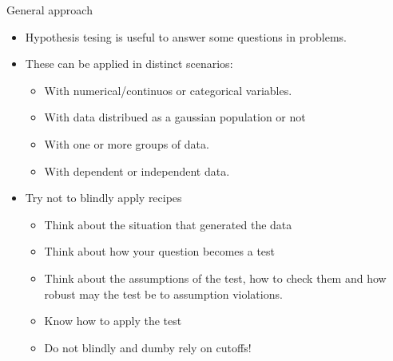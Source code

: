 \documentclass[
  ignorenonframetext,
]{beamer}
\providecommand{\tightlist}{%
  \setlength{\itemsep}{0pt}\setlength{\parskip}{0pt}}
\begin{document}
\begin{frame}{General approach}
\protect\hypertarget{general-approach}{}
\begin{itemize}
\item
  Hypothesis tesing is useful to answer some questions in problems.
\item
  These can be applied in distinct scenarios:

  \begin{itemize}
  \tightlist
  \item
    With numerical/continuos or categorical variables.
  \item
    With data distribued as a gaussian population or not
  \item
    With one or more groups of data.
  \item
    With dependent or independent data.
  \end{itemize}
\item
  Try not to blindly apply recipes

  \begin{itemize}
  \tightlist
  \item
    Think about the situation that generated the data
  \item
    Think about how your question becomes a test
  \item
    Think about the assumptions of the test, how to check them and how
    robust may the test be to assumption violations.
  \item
    Know how to apply the test
  \item
    Do not blindly and dumby rely on cutoffs!
  \end{itemize}
\end{itemize}
\end{frame}
\end{document}
